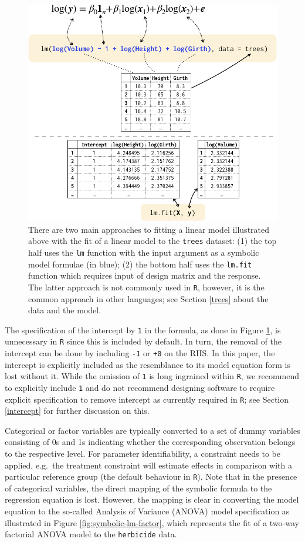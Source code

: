 \documentclass[runningheads]{llncs}\usepackage[]{graphicx}\usepackage[]{color}
\begin{document}
\begin{figure}
	\includegraphics[width=0.9\linewidth,fbox]{images/symbolic_lm} \caption{There are two main approaches to fitting a linear model illustrated above with the fit of a linear model to the \texttt{trees} dataset: (1) the top half uses the \texttt{lm} function  with the input argument as a symbolic model formulae (in blue); (2) the bottom half uses the \texttt{lm.fit} function which requires input of design matrix and the response. The latter approach is not commonly used in \texttt{R}, however, it is the common approach in other languages; see Section \ref{trees} about the data and the model.}\label{fig:symbolic-lm}
\end{figure}



The specification of the intercept by \texttt{1} in the formula, as done in Figure \ref{fig:symbolic-lm}, is unnecessary in \texttt{R} since this is included by default. In turn, the removal of the intercept can be done by including \texttt{-1} or \texttt{+0} on the RHS. In this paper, the intercept is explicitly included as the resemblance to its model equation form is lost without it. While the omission of \texttt{1} is long ingrained within \texttt{R}, we recommend to explicitly include \texttt{1} and do not recommend designing software to require explicit specification to remove intercept as currently required in \texttt{R}; see Section \ref{intercept} for further discussion on this.

Categorical or factor variables are typically converted to a set of dummy variables consisting of 0s and 1s indicating whether the corresponding observation belongs to the respective level. For parameter identifiability, a  constraint needs to be applied, e.g.~the treatment constraint will estimate effects in comparison with a particular reference group (the default behaviour in \texttt{R}). Note that in the presence of categorical variables, the direct mapping of the symbolic formula to the regression equation is lost. However, the mapping is clear in converting the model equation to the so-called Analysis of Variance (ANOVA) model specification as illustrated in Figure \ref{fig:symbolic-lm-factor}, which represents the fit of a two-way factorial ANOVA model to the \texttt{herbicide} data.
\end{document}
